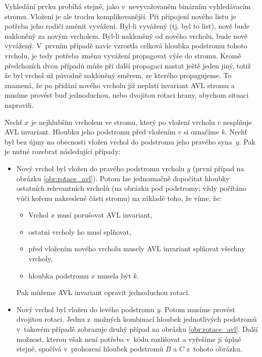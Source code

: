 Vyhledání prvku probíhá stejně, jako v~nevyvažovaném binárním vyhledávacím stromu. 
Vložení je ale trochu komplikovanější. Při připojení nového listu je potřeba
jeho rodiči změnit vyvážení. Byl-li vyvážený (tj. byl to list), nově bude
nakloněný za novým vrcholem. Byl-li nakloněný od nového vrcholu, bude nově
vyvážený. V~prvním případě navíc vzrostla celková hloubka podstromu tohoto
vrcholu, je tedy potřeba změnu vyvážení propagovat výše do stromu. Kromě
předchozích dvou případů  může při další propagaci nastat ještě jeden jiný,
totiž že byl vrchol už původně nakloněný směrem, ze kterého propagujeme. To
znamená, že po přidání nového vrcholu již neplatí invariant AVL stromu a musíme
provést buď jednoduchou, nebo dvojitou rotaci hrany, abychom situaci napravili.

Nechť $x$ je nejhlubším vrcholem ve stromu, který po vložení vrcholu $v$
nesplňuje AVL invariant. Hloubku jeho podstromu před vložením $v$ si označíme
$k$. Nechť byl bez újmy na obecnosti vložen vrchol do podstromu jeho pravého
syna~$y$. Pak je nutné rozebrat následující případy:

\begin{itemize}
\item Nový vrchol byl vložen do pravého podstromu vrcholu $y$ (první případ na
obrázku \ref{obr:rotace_avl}). Potom lze jednoznačně dopočítat hloubky
ostatních relevantních vrcholů (na obrázku pod podstromy; vždy počítáno vůči
kořenu nakreslené části stromu) na základě toho, že víme, že:
\begin{itemize}
\item Vrchol $x$ musí porušovat AVL
invariant, \item ostatní vrcholy ho musí splňovat, \item před vložením nového vrcholu
musely AVL invariant splňovat všechny vrcholy, \item hloubka podstromu $x$ musela
být $k$. 
\end{itemize}
Pak můžeme AVL invariant opravit jednoduchou rotací.  

\item Nový
vrchol byl vložen do levého podstromu $y$. Potom musíme provést
dvojitou rotaci. Jednu z~možných kombinací hloubek jednotlivých podstromů v~takovém případě zobrazuje
druhý případ na obrázku \ref{obr:rotace_avl}. Další možnost, kterou však není potřeba v~kódu
rozlišovat a vyřešíme ji úplně stejně, spočívá v~prohození hloubek podstromů
$B$ a $C$ z~tohoto obrázku.  
\end{itemize}

